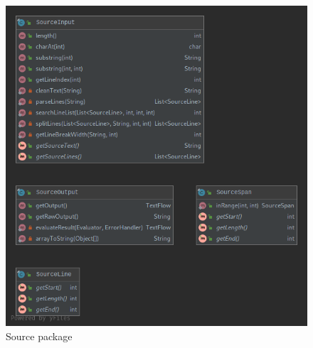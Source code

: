 \documentclass[
]{report}
\begin{document}
\begin{appendices}
\begin{figure}
		\includegraphics[width=\textwidth]{source-package-diagram}
		\caption{Source package}
		\label{fig:source-package-diagram}
	\end{figure}
	\begin{figure}
		\centering

\end{figure}
\end{appendices}
\end{document}
